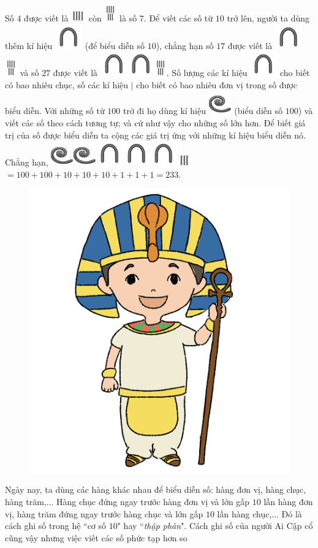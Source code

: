 	\begin{multicols}{2}
	Số $4$ được viết là \includegraphics[scale=0.85]{3} còn \includegraphics{4}  là số $7$. Để viết các số từ $10$ trở lên, người ta dùng thêm kí hiệu \includegraphics[scale=0.85]{5} (để biểu diễn số $10$), chẳng hạn số $17$ được viết là \includegraphics[scale=0.85]{5}\includegraphics[scale=0.85]{4} và số $27$ được viết là  \includegraphics[scale=0.85]{5}\includegraphics[scale=0.85]{5}\includegraphics[scale=0.85]{4}. Số lượng các kí hiệu \includegraphics[scale=0.85]{5} cho biết có bao nhiêu chục, số các kí hiệu $\mid$ cho biết có bao nhiêu đơn vị trong số được biểu diễn. Với những số từ $100$ trở đi họ dùng kí hiệu \includegraphics[scale=0.85]{6} (biểu diễn số $100$) và viết các số theo cách tương tự; và cứ như vậy cho những số lớn hơn. Để biết giá trị của số được biểu diễn ta cộng các giá trị ứng với những kí hiệu biểu diễn nó. Chẳng hạn, \includegraphics[scale=0.85]{6}\includegraphics[scale=0.85]{6}\includegraphics[scale=0.85]{5}\includegraphics[scale=0.85]{5}\includegraphics[scale=0.85]{5}\includegraphics[scale=0.85]{3.1}   $=  100+ 100 + 10 + 10 + 10 + 1 + 1 + 1= 233$.
	\vskip 0.1cm
	\begin{figure}[H]
		\centering
		\vspace*{-5pt}
		\captionsetup{labelformat= empty, justification=centering}
		\includegraphics[width=0.85\linewidth]{20.12-pi.1}
		\vspace*{-15pt}
	\end{figure}
	Ngày nay, ta dùng các hàng khác nhau để biểu diễn số: hàng đơn vị, hàng chục, hàng trăm,... Hàng chục đứng ngay trước hàng đơn vị và lớn gấp $10$ lần hàng đơn vị, hàng trăm đứng ngay trước hàng chục và lớn gấp $10$ lần hàng chục,... Đó là cách ghi số trong hệ ``cơ số $10$" hay ``\textit{thập phân}". Cách ghi số của người Ai Cập cổ cũng vậy nhưng việc viết các số phức tạp hơn so 
\end{multicols}
